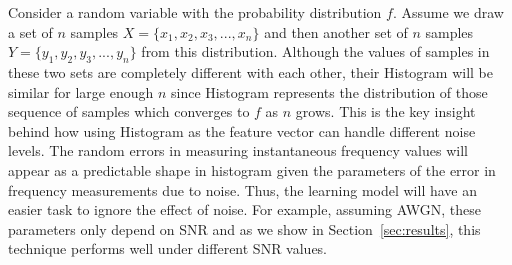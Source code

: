 Consider a random variable with the probability distribution $f$. 
Assume we draw a set of $n$ samples $X=\{x_1,x_2,x_3,...,x_n\}$ and then another set of $n$ samples $Y=\{y_1,y_2,y_3,...,y_n\}$ from this distribution. Although the values of samples in these two sets are completely different with each other, their Histogram will be similar for large enough $n$ since Histogram represents the distribution of those sequence of samples which converges to $f$ as $n$ grows. This is the key insight behind how using Histogram as the feature vector can handle different noise levels. The random errors in measuring instantaneous frequency values will appear as a predictable shape in histogram given the parameters of the error in frequency measurements due to noise. Thus, the learning model will have an easier task to ignore the effect of noise. For example, assuming AWGN, these parameters only depend on SNR and as we show in Section~\ref{sec:results}, this technique performs well under different SNR values.



